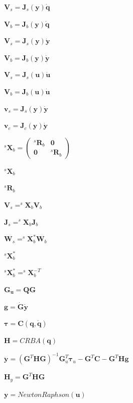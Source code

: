 \documentclass{article}
\begin{document}
$ \mathbf{V}_s = \mathbf{J}_s(\mathbf{y})
\mathbf{\dot{q}}$
\pagebreak

$ \mathbf{V}_b = \mathbf{J}_b(\mathbf{y})
\mathbf{\dot{q}}$
\pagebreak

$ \mathbf{V}_s = \mathbf{J}_s(\mathbf{y})
\mathbf{\dot{y}}$
\pagebreak

$ \mathbf{V}_b = \mathbf{J}_b(\mathbf{y})
\mathbf{\dot{y}}$
\pagebreak

$ \mathbf{V}_s = \mathbf{J}_s(\mathbf{u})
\mathbf{\dot{u}}$
\pagebreak

$ \mathbf{V}_b = \mathbf{J}_b(\mathbf{u})
\mathbf{\dot{u}}$
\pagebreak

$ \mathbf{v}_s =
\mathbf{J}_s(\mathbf{y}) \mathbf{\dot{y}}$
\pagebreak

$ \mathbf{v}_c =
\mathbf{J}_c(\mathbf{y}) \mathbf{\dot{y}}$
\pagebreak

$ ^s\mathbf{X}_b = \left( \begin{array}{cc} ^s\mathbf{R}_b & \mathbf{0}
\\ \mathbf{0} & ^s\mathbf{R}_b \end{array} \right) $
\pagebreak

$^s\mathbf{X}_b $
\pagebreak

$ ^s\mathbf{R}_b $
\pagebreak

$ \mathbf{V}_s =
^s\mathbf{X}_b \mathbf{V}_b $
\pagebreak

$ \mathbf{J}_s =
^s\mathbf{X}_b \mathbf{J}_b $
\pagebreak

$ \mathbf{W}_s =
^s\mathbf{X}_b^* \mathbf{W}_b $
\pagebreak

$ ^s\mathbf{X}_b^* $
\pagebreak

$ ^s\mathbf{X}_b^* =
^s\mathbf{X}_b^{-T} $
\pagebreak

$ \mathbf{G_u} = \mathbf{Q}\mathbf{G}  $
\pagebreak

$ \mathbf{g} = \dot{\mathbf{G}}\mathbf{\dot{y}} $
\pagebreak

$ \mathbf{\tau} = \mathbf{C}(\mathbf{q},\mathbf{\dot{q}}) $
\pagebreak

$ \mathbf{H} = CRBA(\mathbf{q}) $
\pagebreak

$ \mathbf{\ddot{y}} = (\mathbf{G}^T
\mathbf{H}\mathbf{G})^{-1}\mathbf{G}^T_u \mathbf{\tau}_u -
\mathbf{G}^T\mathbf{C} - \mathbf{G}^T \mathbf{H}\mathbf{g} $
\pagebreak

$ \mathbf{H}_y = \mathbf{G}^T \mathbf{H}\mathbf{G} $
\pagebreak

$ \mathbf{y} = NewtonRaphson(\mathbf{u}) $
\pagebreak
\end{document}
